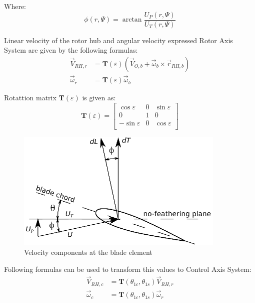 Where:
\begin{equation}
  \phi \left( r , \Psi \right)
  =
  \arctan \frac{ U_P \left( r, \Psi \right) }{ U_T \left( r, \Psi \right) }
\end{equation}

Linear velocity of the rotor hub and angular velocity expressed Rotor Axis System are given by the following formulas: \cite{Stepniewski1984, Bramwell2001}
\begin{align}
  {\vec V}_{RH,r}
  &=
  {\boldsymbol T} \left( \varepsilon \right)
  \left(
    {\vec V}_{O,b} + {\vec \omega}_b \times {\vec r}_{RH,b}
  \right) \\
  {\vec \omega}_r
  &=
  {\boldsymbol T} \left( \varepsilon \right)
  {\vec \omega}_b
\end{align}

Rotattion matrix ${\boldsymbol T} \left( \varepsilon \right)$ is given as:
\begin{equation}
  {\boldsymbol T} \left( \varepsilon \right)
  =
  \left[
    \begin{matrix}
       \cos \varepsilon & 0 & \sin \varepsilon \\
                        0 & 1 &              0 \\
      -\sin \varepsilon & 0 & \cos \varepsilon \\
    \end{matrix}
  \right]
\end{equation}

\begin{figure}
  \centering
  \includegraphics[width=100mm]{images/blade_element_theory_02.eps}
  \caption{Velocity components at the blade element}
\end{figure}

Following formulas can be used to transform this values to Control Axis System:
\begin{align}
  {\vec V}_{RH,c} 
  &=
  {\boldsymbol T} \left( \theta_{1c}, \theta_{1s} \right)
  {\vec V}_{RH,r} \\
  {\vec \omega}_c
  &=
  {\boldsymbol T} \left( \theta_{1c}, \theta_{1s} \right)
  {\vec \omega}_r
\end{align}

